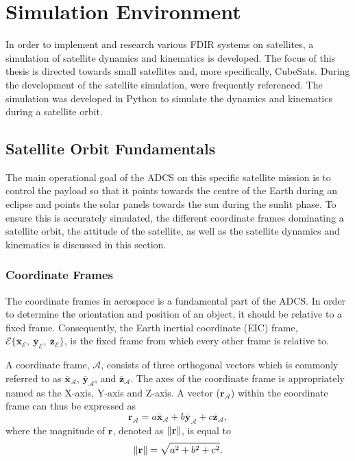 \chapter{Simulation Environment}
\label{chap:Simulation}

In order to implement and research various FDIR systems on satellites, a simulation of satellite dynamics and kinematics is developed. The focus of this thesis is directed towards small satellites and, more specifically, CubeSats. During the development of the satellite simulation,\cite{auret2012design, JansevanVuuren2015, Jordaan2016, jeger2017determination} were frequently referenced. The simulation was developed in Python to simulate the dynamics and kinematics during a satellite orbit.

\section{Satellite Orbit Fundamentals}

 The main operational goal of the ADCS on this specific satellite mission is to control the payload so that it points towards the centre of the Earth during an eclipse and points the solar panels towards the sun during the sunlit phase. To ensure this is accurately simulated, the different coordinate frames dominating a satellite orbit, the attitude of the satellite, as well as the satellite dynamics and kinematics is discussed in this section.

\subsection{Coordinate Frames}
The coordinate frames in aerospace is a fundamental part of the ADCS. In order to determine the orientation and position of an object, it should be relative to a fixed frame. Consequently, the Earth inertial coordinate (EIC) frame, $\mathcal{E}\{\bar{\mathbf{x}}_{\mathcal{E}},~\bar{\mathbf{y}}_{\mathcal{E}},~\bar{\mathbf{z}}_{\mathcal{E}}\}$, is the fixed frame from which every other frame is relative to.

A coordinate frame, $\mathcal{A}$, consists of three orthogonal vectors which is commonly referred to as $\bar{\mathbf{x}}_\mathcal{A}$, $\bar{\mathbf{y}}_\mathcal{A}$, and $\bar{\mathbf{z}}_\mathcal{A}$. The axes of the coordinate frame is appropriately named as the X-axis, Y-axis and Z-axis. A vector ($\mathbf{r}_\mathcal{A}$) within the coordinate frame can thus be expressed as 
\begin{equation}
\mathbf{r}_\mathcal{A} = a\bar{\mathbf{x}}_\mathcal{A} + b\bar{\mathbf{y}}_\mathcal{A} + c\bar{\mathbf{z}}_\mathcal{A},
\end{equation}
where the magnitude of $\mathbf{r}$, denoted as $\left\lVert\mathbf{r}\right\rVert$, is equal to 
\begin{equation}
\left\lVert\mathbf{r}\right\rVert = \sqrt{a^2 + b^2 + c^2}.
\end{equation}

